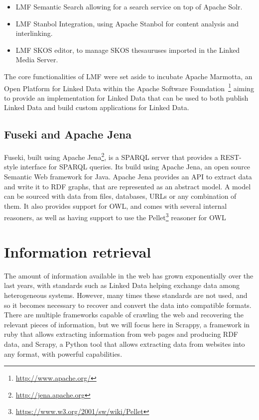 \begin{itemize}%
  \item \ac{LMF} Semantic Search allowing for a search service on top of Apache Solr. 
  \item \ac{LMF} Stanbol Integration, using Apache Stanbol for content analysis and interlinking.
  \item \ac{LMF} SKOS editor, to manage SKOS thesauruses imported in the Linked Media Server.
\end{itemize}

The core functionalities of \ac{LMF} were set aside to incubate Apache Marmotta, an Open Platform for Linked Data within the Apache Software Foundation~\footnote{\url{http://www.apache.org/}} aiming to provide an implementation for Linked Data that can be used to both publish Linked Data and build custom applications for Linked Data.

\subsection{Fuseki and Apache Jena}

Fuseki, built using Apache Jena\footnote{\url{http://jena.apache.org}}, is a \ac{SPARQL} server that provides a REST-style interface for \ac{SPARQL} queries. Its build using Apache Jena, an open source Semantic Web framework for Java. Apache Jena provides an API to extract data and write it to \ac{RDF} graphs, that are represented as an abstract model. A model can be sourced with data from files, databases, URLs or any combination of them. It also provides support for \ac{OWL}, and comes with several internal reasoners, as well as having support to use the Pellet\footnote{\url{https://www.w3.org/2001/sw/wiki/Pellet}} reasoner for \ac{OWL}




\section{Information retrieval}

The amount of information available in the web has grown exponentially over the last years, with standards such as Linked Data helping exchange data among heterogeneous systems. However, many times these standards are not used, and so it becomes necessary to recover and convert the data into compatible formats. There are multiple frameworks capable of crawling the web and recovering the relevant pieces of information, but we will focus here in Scrappy, a framework in ruby that allows extracting information from web pages and producing RDF data, and Scrapy, a Python tool that allows extracting data from websites into any format, with powerful capabilities.

